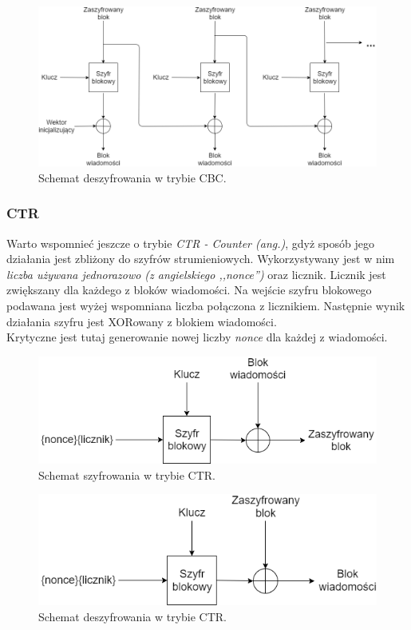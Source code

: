 \begin{figure}
    \centering
	\includegraphics[width=\textwidth]{content/images/cbc-dec-scheme}
    \caption{Schemat deszyfrowania w trybie CBC.}
\end{figure}

\subsubsection{CTR}
Warto wspomnieć jeszcze o trybie \textit{CTR - Counter (ang.)}, gdyż sposób jego działania jest zbliżony 
do szyfrów strumieniowych. Wykorzystywany jest w nim \textit{liczba używana jednorazowo (z angielskiego ,,nonce'')}
oraz licznik. Licznik jest zwiększany dla każdego z bloków wiadomości. 
Na wejście szyfru blokowego podawana jest wyżej wspomniana liczba połączona z licznikiem. Następnie wynik
działania szyfru jest XORowany z blokiem wiadomości. \\
Krytyczne jest tutaj generowanie nowej liczby \textit{nonce} dla każdej z wiadomości. 

\begin{figure}[t]
    \centering
	\includegraphics[width=\textwidth]{content/images/ctr-enc-scheme}
    \caption{Schemat szyfrowania w trybie CTR.}
\end{figure}
\begin{figure}[t]
    \centering
	\includegraphics[width=\textwidth]{content/images/ctr-dec-scheme}
    \caption{Schemat deszyfrowania w trybie CTR.}
\end{figure}

